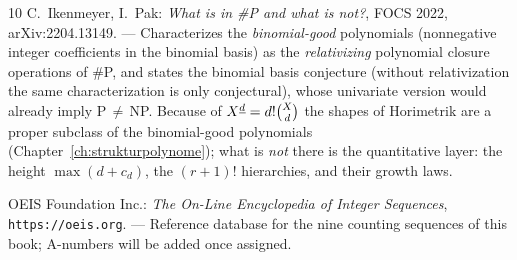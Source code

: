 \begin{thebibliography}{10}
 C.~Ikenmeyer, I.~Pak: \emph{What is in \#P
and what is not?}, FOCS 2022, arXiv:2204.13149.
--- Characterizes the \emph{binomial-good} polynomials
(nonnegative integer coefficients in the binomial basis) as the
\emph{relativizing} polynomial closure operations of \#P, and
states the binomial basis conjecture (without relativization the
same characterization is only conjectural), whose univariate
version would already imply P$\,\ne\,$NP. Because of
$X^{\underline{d}}=d!\binom Xd$ the shapes of Horimetrik are a proper
subclass of the binomial-good polynomials
(Chapter~\ref{ch:strukturpolynome}); what is \emph{not} there is
the quantitative layer: the height $\max(d+c_d)$, the $(r{+}1)!$
hierarchies, and their growth laws.

 OEIS Foundation Inc.: \emph{The On-Line Encyclopedia
of Integer Sequences}, \texttt{https://oeis.org}.
--- Reference database for the nine counting sequences of this
book; A-numbers will be added once assigned.

\end{thebibliography}
\endgroup
